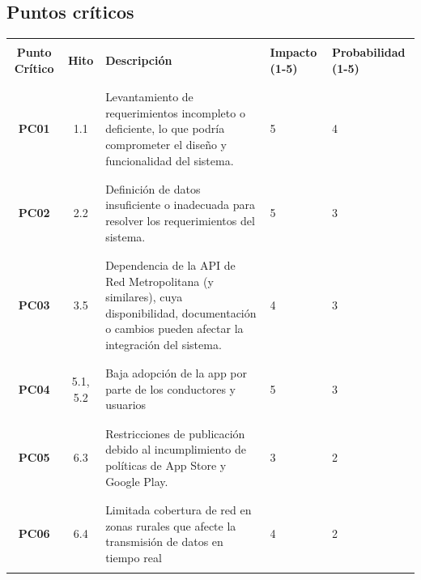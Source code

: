 \documentclass[12pt]{article}
\begin{document}
\subsection{Puntos críticos}
\begin{table}[!h]
    \centering
    \begin{tabular}{|c|c|p{6cm}|p{2cm}|p{2.5cm}|}
        \hline
        &&&&\\
         \textbf{Punto Crítico} & \textbf{Hito} & \textbf{Descripción} & \textbf{Impacto (1-5)} & \textbf{Probabilidad (1-5)} \\
         &&&&\\
         \hline
         &&&&\\
         \textbf{PC01} & 1.1 & Levantamiento de requerimientos incompleto o deficiente, lo que podría comprometer el diseño y funcionalidad del sistema. & 5 & 4 \\
         &&&&\\
         \hline
         &&&&\\
         \textbf{PC02} & 2.2 & Definición de datos insuficiente o inadecuada para resolver los requerimientos del sistema. & 5 & 3 \\
         &&&&\\
         \hline
         &&&&\\
         \textbf{PC03} & 3.5 & Dependencia de la API de Red Metropolitana (y similares), cuya disponibilidad, documentación o cambios pueden afectar la integración del sistema. & 4 & 3 \\ 
         &&&&\\
         \hline
         &&&&\\
         \textbf{PC04} & 5.1, 5.2 & Baja adopción de la app por parte de los conductores y usuarios & 5 & 3\\
         &&&&\\
         \hline
         &&&&\\
         \textbf{PC05} & 6.3 & Restricciones de publicación debido al incumplimiento de políticas de App Store y Google Play. & 3 & 2 \\
         &&&&\\
         \hline
         &&&&\\
         \textbf{PC06} & 6.4 & Limitada cobertura de red en zonas rurales que afecte la transmisión de datos en tiempo real & 4 & 2 \\
         &&&&\\
         \hline
    \end{tabular}
\end{table}
\newpage
\end{document}
